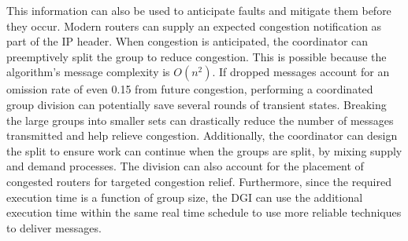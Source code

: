 This information can also be used to anticipate faults and mitigate them before they occur.
Modern routers can supply an expected congestion notification as part of the IP header\cite{ECN2}.
When congestion is anticipated, the coordinator can preemptively split the group to reduce congestion.
This is possible because the algorithm's message complexity is $O(n^2)$.
If dropped messages account for an omission rate of even 0.15 from future congestion, performing a coordinated group division can potentially save several rounds of transient states.
Breaking the large groups into smaller sets can drastically reduce the number of messages transmitted and help relieve congestion.
Additionally, the coordinator can design the split to ensure work can continue when the groups are split, by mixing supply and demand processes.
The division can also account for the placement of congested routers for targeted congestion relief.
Furthermore, since the required execution time is a function of group size, the DGI can use the additional execution time within the same real time schedule to use more reliable techniques to deliver messages.

